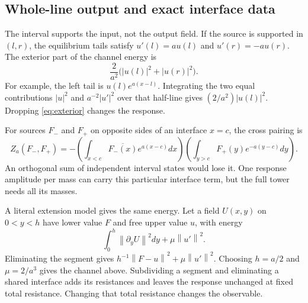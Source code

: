 \documentclass[11pt]{article}
\numberwithin{equation}{section}
\theoremstyle{definition}
\theoremstyle{remark}
\newcommand{\norm}[1]{\left\lVert#1\right\rVert}
\begin{document}
\subsection{Whole-line output and exact interface data}
The interval supports the input, not the output field. If the source is supported in $(l,r)$, the equilibrium tails satisfy $u'(l)=au(l)$ and $u'(r)=-au(r)$. The exterior part of the channel energy is
\begin{equation}
 \frac2{a^2}\bigl(|u(l)|^2+|u(r)|^2\bigr).
 \label{eq:exterior}
\end{equation}
For example, the left tail is $u(l)e^{a(x-l)}$. Integrating the two equal contributions $|u|^2$ and $a^{-2}|u'|^2$ over that half-line gives $(2/a^2)|u(l)|^2$. Dropping \eqref{eq:exterior} changes the response.

For sources $F_-$ and $F_+$ on opposite sides of an interface $x=c$, the cross pairing is
\begin{equation}
 Z_a(F_-,F_+)=-
 \left(\int_{x<c}\overline{F_-(x)}e^{a(x-c)}dx\right)
 \left(\int_{y>c}F_+(y)e^{-a(y-c)}dy\right).
 \label{eq:crossgamma}
\end{equation}
An orthogonal sum of independent interval states would lose it. One response amplitude per mass can carry this particular interface term, but the full tower needs all its masses.

A literal extension model gives the same energy. Let a field $U(x,y)$ on $0<y<h$ have lower value $F$ and free upper value $u$, with energy
\begin{equation}
 \int_0^h\norm{\partial_yU}^2dy+\mu\norm{u'}^2.
\end{equation}
Eliminating the segment gives $h^{-1}\norm{F-u}^2+\mu\norm{u'}^2$. Choosing $h=a/2$ and $\mu=2/a^3$ gives the channel above. Subdividing a segment and eliminating a shared interface adds its resistances and leaves the response unchanged at fixed total resistance. Changing that total resistance changes the observable.
\end{document}
